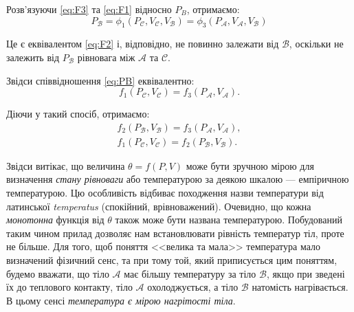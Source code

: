 Розв'язуючи \eqref{eq:F3} та \eqref{eq:F1} відносно $P_B$, отримаємо:
\begin{equation}\label{eq:PB}
	P_{\mathcal{B}} = \phi_1 (P_{\mathcal{C}}, V_{\mathcal{C}}, V_{\mathcal{B}})=\phi_3
	(P_{\mathcal{A}}, V_{\mathcal{A}}, V_{\mathcal{B}})
\end{equation}

\noindent Це є еквівалентом \eqref{eq:F2} і, відповідно,  не повинно залежати від $\mathcal{B}$,
оскільки не
залежить від $P_{\mathcal{B}}$ рівновага між $\mathcal{A}$ та $\mathcal{C}$.

Звідси співвідношення \eqref{eq:PB} еквівалентно:
\begin{equation}\label{eq:f1}
	f_1 (P_{\mathcal{C}},V_{\mathcal{C}})=f_3 (P_{\mathcal{A}}, V_{\mathcal{A}}).
\end{equation}

Діючи у такий спосіб, отримаємо:
\begin{align}
	f_2 (P_{\mathcal{B}}, V_{\mathcal{B}})=f_3 (P_{\mathcal{A}}, V_{\mathcal{A}}), \\
	f_1 (P_{\mathcal{C}}, V_{\mathcal{C}})=f_2 (P_{\mathcal{B}}, V_{\mathcal{B}}).
\end{align}

Звідси витікає, що величина $\theta = f(P, V)$ може бути зручною мірою для визначення \textit{стану
	рівноваги} або температурою за деякою шкалою --- емпіричною температурою. Цю особливість відбиває
походження назви температури від латинської \emph{temperatus} (спокійний, врівноважений). Очевидно, що
кожна \emph{монотонна} функція від $\theta$ також може бути названа температурою. Побудований таким
чином прилад дозволяє нам встановлювати рівність температур тіл, проте не більше. Для того, щоб
поняття
<<велика та мала>> температура мало визначений фізичний сенс, та при тому той, який приписується
цим
поняттям, будемо вважати, що тіло $\mathcal{A}$ має більшу температуру за тіло $\mathcal{B}$, якщо при
зведені їх до теплового контакту, тіло $\mathcal{A}$ охолоджується, а тіло $\mathcal{B}$ натомість
нагрівається. В цьому сенсі \emph{температура є мірою нагрітості тіла}.

